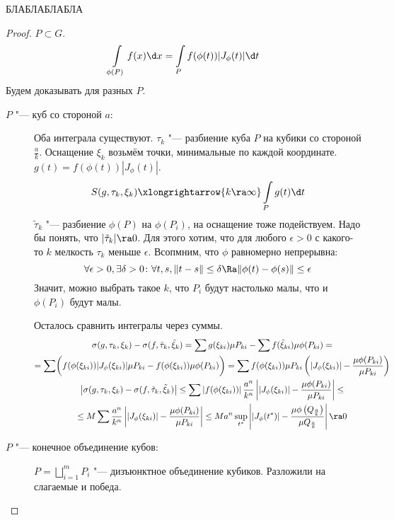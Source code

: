 \begin{theorem}
БЛАБЛАБЛАБЛА
\end{theorem}
\begin{proof}
	$P \subset G$.
	\[ \int\limits_{\phi(P)} f(x) \d x = \int\limits_P f(\phi(t)) |J_\phi(t)| \d t \]
	Будем доказывать для разных $P$.
	\begin{description}
	\item[$P$ "--- куб со стороной $a$:]
		Оба интеграла существуют.
		$\tau_k$ "--- разбиение куба $P$ на кубики со стороной $\frac{a}k$.
		Оснащение $\xi_k$ возьмём точки, минимальные по каждой координате.
		$g(t) = f(\phi(t)) |J_\phi(t)|$.
		\[
			S(g, \tau_k, \xi_k) \xlongrightarrow{k \ra \infty} \int\limits_P g(t) \d t \\
		\]
		$\tilde \tau_k$ "--- разбиение $\phi(P)$  на $\phi(P_i)$, на оснащение тоже подействуем.
		Надо бы понять, что $|\tilde \tau_k| \ra 0$.
		Для этого хотим, что для любого $\epsilon > 0$ с какого-то $k$ мелкость $\tau_k$ меньше $\epsilon$.
		Всопмним, что $\phi$ равномерно непрерывна:
		\[
			\forall \epsilon > 0, \exists \delta > 0\colon \forall t,s, \|t-s\| \le \delta \Ra \|\phi(t) - \phi(s)\| \le \epsilon
		\]
		Значит, можно выбрать такое $k$, что $P_i$ будут настолько малы, что и $\phi(P_i)$ будут малы.

		Осталось сравнить интегралы через суммы.
		\begin{gather*}
			\sigma(g, \tau_k, \xi_k) - \sigma(f, \tilde \tau_k, \tilde \xi_k)
			= \sum g(\xi_{ki}) \mu P_{ki} - \sum f(\tilde\xi_{ki}) \mu \phi(P_{ki}) = \\
			= \sum \biggl( f(\phi(\xi_{ki})) |J_\phi (\xi_{ki})| \mu P_{ki} - f(\phi(\xi_{ki})) \mu \phi(P_{ki}) \biggr)
			= \sum f(\phi(\xi_{ki})) \mu P_{ki} \left( |J_\phi (\xi_{ki})| - \frac{\mu \phi(P_{ki})}{\mu P_{ki}} \right) \\
			\left| \sigma(g, \tau_k, \xi_k) - \sigma(f, \tilde \tau_k, \tilde \xi_k) \right|
			\le \sum\left|f(\phi(\xi_{ki}))\right|\frac{a^n}{k^n} \left||J_\phi (\xi_{ki})| - \frac{\mu\phi(P_{ki})}{\mu P_{ki}} \right| \le \\ 
			\le M \sum \frac{a^n}{k^n} \left| |J_\phi (\xi_{ki})| - \frac{\mu \phi(P_{ki})}{\mu P_{ki}} \right|
			\le M a^n \sup_{t^*} \left| |J_\phi (t^*)| - \frac{\mu \phi\left(Q_{\frac{a}k}\right)}{\mu Q_{\frac{a}k}} \right| \ra 0
		\end{gather*}

	\item[$P$ "--- конечное объединение кубов:]
		$P = \bigsqcup_{i=1}^m P_i$ "--- дизъюнктное объединение кубиков.
		Разложили на слагаемые и победа.


\end{description}
\end{proof}
